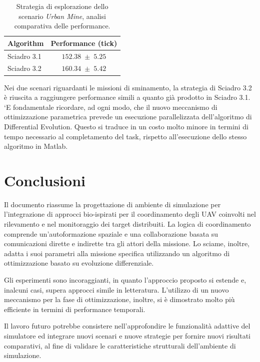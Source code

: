 \begin{table}[H]
    \centering
    \captionsetup{justification=centering, margin=2cm, font=footnotesize}
    \begin{tabular}{|l|c|}
    \hline
    \textbf{Algorithm}              & \textbf{Performance (tick)}       \\ \hline
    Sciadro 3.1                     & $152.38 \; \pm \; 5.25$           \\ \hline
    Sciadro 3.2                     & $160.34 \; \pm \; 5.42$           \\ \hline
    \end{tabular}%
    
    \caption{Strategia di esplorazione dello scenario \textit{Urban Mine}, analisi comparativa delle performance.}
    \label{analisi_comparativa_esplorazione_urbanMine}
\end{table}

Nei due scenari riguardanti le missioni di sminamento, la strategia di Sciadro 3.2 è riuscita a raggiungere performance simili a quanto già prodotto in Sciadro 3.1.
`E fondamentale ricordare, ad ogni modo, che il nuovo meccanismo di ottimizzazione parametrica prevede un esecuzione parallelizzata dell'algoritmo di Differential Evolution.
Questo si traduce in un costo molto minore in termini di tempo necessario al completamento del task, rispetto all'esecuzione dello stesso algoritmo in Matlab.

\section{Conclusioni}

Il documento riassume la progettazione di ambiente di simulazione per l’integrazione di approcci bio-ispirati per il coordinamento degli UAV coinvolti nel rilevamento e nel monitoraggio dei target distribuiti. 
La logica di coordinamento comprende un'autoformazione spaziale e una collaborazione basata su comunicazioni dirette e indirette tra gli attori della missione. 
Lo sciame, inoltre, adatta i suoi parametri alla missione specifica utilizzando un algoritmo di ottimizzazione basato su evoluzione differenziale. 

Gli esperimenti sono incoraggianti, in quanto l'approccio proposto si estende e, inalcuni casi, supera approcci simile in letteratura. 
L’utilizzo di un nuovo meccanismo per la fase di ottimizzazione, inoltre, si è dimostrato molto più efficiente in termini di performance temporali.

Il lavoro futuro potrebbe consistere nell’approfondire le funzionalità adattive del simulatore ed integrare nuovi scenari e nuove strategie per fornire nuovi risultati comparativi, al fine di validare le caratteristiche strutturali dell’ambiente di simulazione.